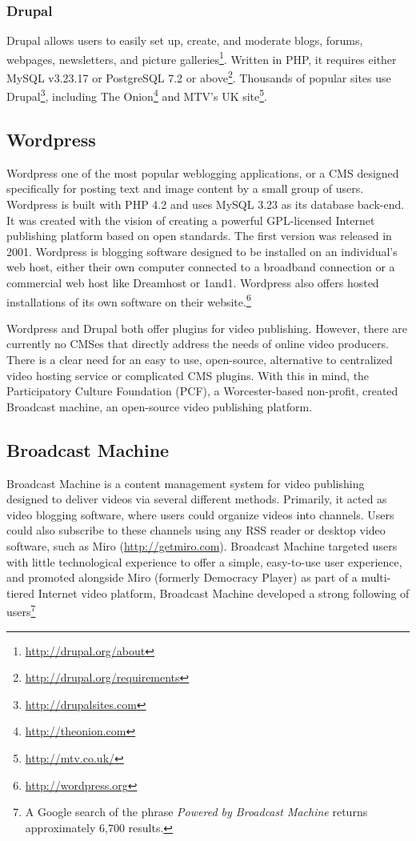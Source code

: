 \documentclass[a4paper,12pt]{report}
\begin{document}
\subsubsection{Drupal}
Drupal allows users to easily set up, create, and moderate blogs, forums, webpages, newsletters, and picture galleries\footnote{\url{http://drupal.org/about}}.
Written in PHP, it requires either MySQL v3.23.17 or PostgreSQL 7.2 or above\footnote{\url{http://drupal.org/requirements}}.
Thousands of popular sites use Drupal\footnote{\url{http://drupalsites.com}}, including The Onion\footnote{\url{http://theonion.com}} and MTV's UK site\footnote{\url{http://mtv.co.uk/}}.

\subsection{Wordpress}
Wordpress one of the most popular weblogging applications, or a CMS designed specifically for posting text and image content by a small group of users.
Wordpress is built with PHP 4.2 and uses MySQL 3.23 as its database back-end. 
It was created with the vision of creating a powerful GPL-licensed Internet publishing platform based on open standards. 
The first version was released in 2001. 
Wordpress is blogging software designed to be installed on an individual's web host, either their own computer connected to a broadband connection or a commercial web host like Dreamhost or 1and1. Wordpress also offers hosted installations of its own software on their website.\footnote{\url{http://wordpress.org}}

Wordpress and Drupal both offer plugins for video publishing. However, there are currently no CMSes that directly address the needs of online video producers. There is a clear need for an easy to use, open-source, alternative to centralized video hosting service or complicated CMS plugins. With this in mind, the Participatory Culture Foundation (PCF), a Worcester-based non-profit, created Broadcast machine, an open-source video publishing platform.

\subsection {Broadcast Machine}
Broadcast Machine is a content management system for video publishing designed to deliver videos via several different methods. Primarily, 
it acted as video blogging software, where users could organize videos into channels. Users could also subscribe to these channels using any RSS reader or desktop video software, such as Miro (\url{http://getmiro.com}). Broadcast Machine targeted users with little technological experience to offer a simple, easy-to-use user experience, and promoted alongside Miro (formerly Democracy Player) as part of a multi-tiered Internet video platform, Broadcast Machine developed a strong following of users\footnote{A Google search of the phrase \textit{Powered by Broadcast Machine} returns approximately 6,700 results.}
\end{document}
